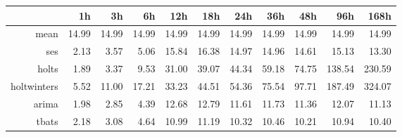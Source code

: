 \begin{table}[ht]
\centering
\begin{tabular}{rrrrrrrrrrr}
  \hline
 & 1h & 3h & 6h & 12h & 18h & 24h & 36h & 48h & 96h & 168h \\ 
  \hline
mean & 14.99 & 14.99 & 14.99 & 14.99 & 14.99 & 14.99 & 14.99 & 14.99 & 14.99 & 14.99 \\ 
  ses & 2.13 & 3.57 & 5.06 & 15.84 & 16.38 & 14.97 & 14.96 & 14.61 & 15.13 & 13.30 \\ 
  holts & 1.89 & 3.37 & 9.53 & 31.00 & 39.07 & 44.34 & 59.18 & 74.75 & 138.54 & 230.59 \\ 
  holtwinters & 5.52 & 11.00 & 17.21 & 33.23 & 44.51 & 54.36 & 75.54 & 97.71 & 187.49 & 324.07 \\ 
  arima & 1.98 & 2.85 & 4.39 & 12.68 & 12.79 & 11.61 & 11.73 & 11.36 & 12.07 & 11.13 \\ 
  tbats & 2.18 & 3.08 & 4.64 & 10.99 & 11.19 & 10.32 & 10.46 & 10.21 & 10.94 & 10.40 \\ 
   \hline
\end{tabular}
\end{table}



